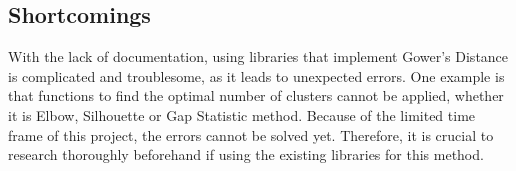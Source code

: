 \subsection{Shortcomings}
With the lack of documentation, using libraries that implement Gower’s Distance is complicated and troublesome, as it leads to unexpected errors. One example is that functions to find the optimal number of clusters cannot be applied, whether it is Elbow, Silhouette or Gap Statistic method. Because of the limited time frame of this project, the errors cannot be solved yet. Therefore, it is crucial to research thoroughly beforehand if using the existing libraries for this method.